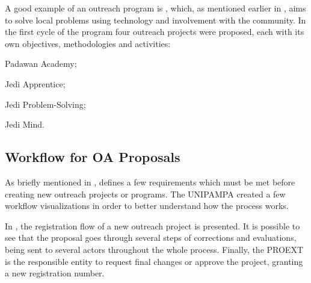 A good example of an outreach program is , which, as mentioned earlier in , aims to solve local problems using technology and involvement with the community. In the first cycle of the program four outreach projects were proposed, each with its own objectives, methodologies and activities:
\begin{inparaenum}[(i)]
  \item Padawan Academy;
  \item Jedi Apprentice;
  \item Jedi Problem-Solving;
  \item Jedi Mind.
\end{inparaenum}

\subsection{Workflow for \acl{OA} Proposals}\label{sec:bac-proposals}

As briefly mentioned in ,  defines a few requirements which must be met before creating new outreach projects or programs. The \acl{UNIPAMPA} created a few workflow visualizations in order to better understand how the process works.


In , the registration flow of a new outreach project is presented. It is possible to see that the proposal goes through several steps of corrections and evaluations, being sent to several actors throughout the whole process. Finally, the \acl{PROEXT} is the responsible entity to request final changes or approve the project, granting a new registration number.

